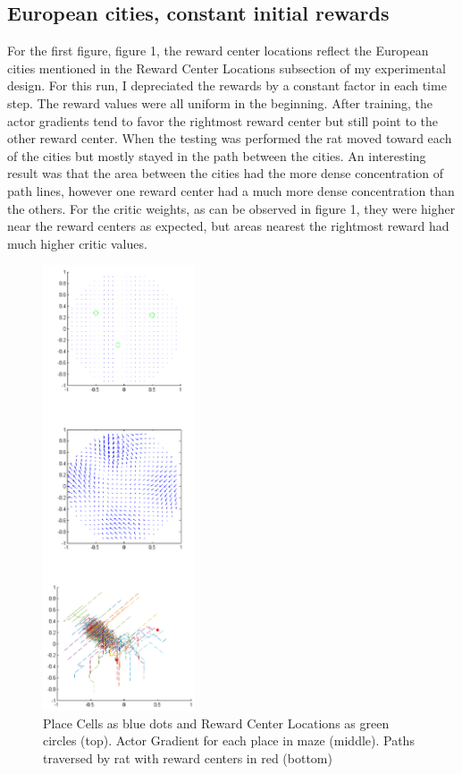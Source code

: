 \documentclass[conference]{IEEEtran}
\begin{document}
\subsection{European cities, constant initial rewards}

For the first figure, figure 1, the reward center locations reflect the European cities mentioned in the Reward Center Locations subsection of my experimental design. For this run, I depreciated the rewards by a constant factor in each time step. The reward values were all uniform in the beginning. After training, the actor gradients tend to favor the rightmost reward center but still point to the other reward center. When the testing was performed the rat moved toward each of the cities but mostly stayed in the path between the cities. An interesting result was that the area between the cities had the more dense concentration of path lines, however one reward center had a much more dense concentration than the others. For the critic weights, as can be observed in figure 1, they were higher near the reward centers as expected, but areas nearest the rightmost reward had much higher critic values.

\begin{figure}
\includegraphics[width=0.4\textwidth]{waterMazeRevised2_Figure.png} 
\caption{Place Cells as blue dots and Reward Center Locations as green circles (top). Actor Gradient for each place in maze (middle). Paths traversed by rat with reward centers in red (bottom)}
\end{figure}
\end{document}
